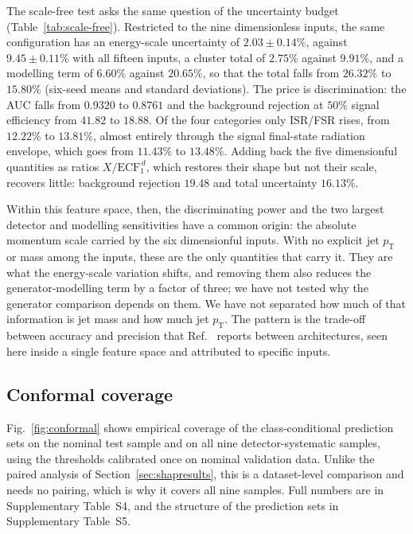 \documentclass[pdflatex,sn-mathphys,Numbered,iicol]{sn-jnl}
\newcommand{\pt}{p_{\mathrm{T}}}
\begin{document}
The scale-free test asks the same question of the uncertainty budget
(Table~\ref{tab:scale-free}). Restricted to the nine dimensionless inputs, the same
configuration has an energy-scale uncertainty of $2.03 \pm 0.14\%$, against
$9.45 \pm 0.11\%$ with all fifteen inputs, a cluster total of $2.75\%$ against
$9.91\%$, and a modelling term of $6.60\%$ against $20.65\%$, so that the total falls
from $26.32\%$ to $15.80\%$ (six-seed means and standard deviations). The price is
discrimination: the AUC falls from $0.9320$ to $0.8761$ and the background rejection at
$50\%$ signal efficiency from $41.82$ to $18.88$. Of the four categories only ISR/FSR
rises, from $12.22\%$ to $13.81\%$, almost entirely through the signal final-state
radiation envelope, which goes from $11.43\%$ to $13.48\%$. Adding back the five
dimensionful quantities as ratios $X/\mathrm{ECF}_1^{\,d}$, which restores their shape
but not their scale, recovers little: background rejection $19.48$ and total
uncertainty $16.13\%$.



Within this feature space, then, the discriminating power and the two largest detector
and modelling sensitivities have a common origin: the absolute momentum scale carried by
the six dimensionful inputs. With no explicit jet $\pt$ or mass among the inputs, these
are the only quantities that carry it. They are what the energy-scale variation shifts,
and removing them also reduces the generator-modelling term by a factor of three; we
have not tested why the generator comparison depends on them. We have not separated
how much of that information is jet mass and how much jet $\pt$. The pattern is the
trade-off between accuracy and precision that Ref.~\cite{ATLAS2024} reports between
architectures, seen here inside a single feature space and attributed to specific inputs.

\subsection{Conformal coverage}
\label{sec:conformalresults}

Fig.~\ref{fig:conformal} shows empirical coverage of the class-conditional prediction
sets on the nominal test sample and on all nine detector-systematic samples, using the
thresholds calibrated once on nominal validation data. Unlike the paired analysis of
Section~\ref{sec:shapresults}, this is a dataset-level comparison and needs no pairing,
which is why it covers all nine samples. Full numbers are in Supplementary Table~S4,
and the structure of the prediction sets in Supplementary Table~S5.
\end{document}
